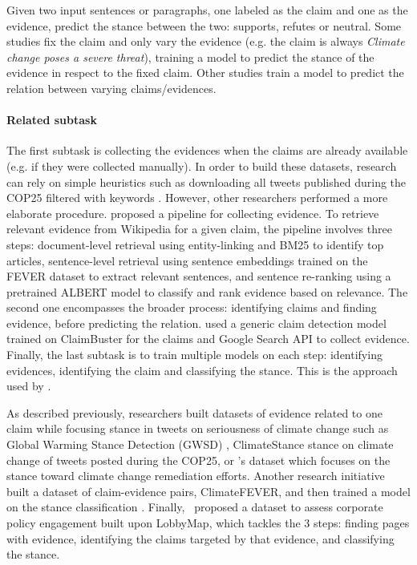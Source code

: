 \task Given two input sentences or paragraphs, one labeled as the claim and one as the evidence, predict the stance between the two: supports, refutes or neutral. Some studies fix the claim and only vary the evidence (e.g. the claim is always \textit{Climate change poses a severe threat}), training a model to predict the stance of the evidence in respect to the fixed claim. 
Other studies train a model to predict the relation between varying claims/evidences.

\paragraph{Related subtask} The first subtask is collecting the evidences when the claims are already available (e.g. if they were collected manually). In order to build these datasets, research can rely on simple heuristics such as downloading all tweets published during the COP25 filtered with keywords \cite{vaid-etal-2022-towards}. However, other researchers performed a more elaborate procedure. \citet{diggelmann_climate-fever_2020} proposed a pipeline for collecting evidence. To retrieve relevant evidence from Wikipedia for a given claim, the pipeline involves three steps: document-level retrieval using entity-linking and BM25 to identify top articles, sentence-level retrieval using sentence embeddings trained on the FEVER dataset to extract relevant sentences, and sentence re-ranking using a pretrained ALBERT model to classify and rank evidence based on relevance. 
The second one encompasses the broader process: identifying claims and finding evidence, before predicting the relation. \citet{Wang2021EvidenceBA} used a generic claim detection model trained on ClaimBuster \cite{Arslan_Hassan_Li_Tremayne_2020} for the claims and Google Search API to collect evidence. 
Finally, the last subtask is to train multiple models on each step: identifying evidences, identifying the claim and classifying the stance. This is the approach used by \cite{morio2023an}.

\datasets As described previously, researchers built datasets of evidence related to one claim while focusing stance in tweets on seriousness of climate change such as Global Warming Stance Detection (GWSD) \cite{luo_detecting_2020}, ClimateStance \cite{vaid-etal-2022-towards} stance on climate change of tweets posted during the COP25, or \citet{lai_using_2023}'s dataset which focuses on the stance toward climate change remediation efforts.
Another research initiative built a dataset of claim-evidence pairs, ClimateFEVER, and then trained a model on the stance classification \cite{diggelmann_climate-fever_2020, Wang2021EvidenceBA}.
Finally,~\citet{morio2023an} proposed a dataset to assess corporate policy engagement built upon LobbyMap, which tackles the 3 steps: finding pages with evidence, identifying the claims targeted by that evidence, and classifying the stance.

